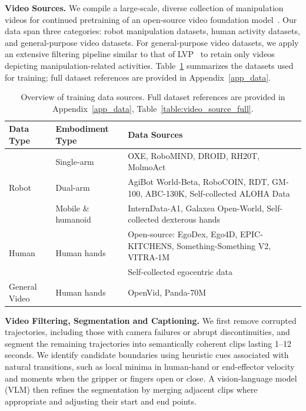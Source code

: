 \textbf{Video Sources.}
We compile a large-scale, diverse collection of manipulation videos for continued pretraining of an open-source video foundation model~\citep{wan2025wan}. Our data span three categories: robot manipulation datasets, human activity datasets, and general-purpose video datasets. For general-purpose video datasets, we apply an extensive filtering pipeline similar to that of LVP~\citep{chen2025large} to retain only videos depicting manipulation-related activities. Table~\ref{table:video_source} summarizes the datasets used for training; full dataset references are provided in Appendix~\ref{app_data}.

\begin{table}[h]
    \centering
    \small
    \setlength{\tabcolsep}{4pt}
    \renewcommand{\arraystretch}{1}
    \begin{tabularx}{\linewidth}{@{}llX@{}}
        \toprule
        Data Type & Embodiment Type & Data Sources \\
        \midrule
        \multirow{3}{*}{Robot}
        & Single-arm
        & OXE, RoboMIND, DROID, RH20T, MolmoAct \\
        & Dual-arm
        & AgiBot World-Beta, RoboCOIN, RDT, GM-100, ABC-130K, Self-collected ALOHA Data\\
        & Mobile \& humanoid
        & InternData-A1, Galaxea Open-World, Self-collected dexterous hands \\
        \midrule
        \multirow{2}{*}{Human}
        & \multirow{2}{*}{Human hands}
        & Open-source: EgoDex, Ego4D, EPIC-KITCHENS, Something-Something V2, VITRA-1M \\
        & & Self-collected egocentric data\\
        \midrule
        General Video
        & Human hands
        & OpenVid, Panda-70M \\
        \bottomrule
    \end{tabularx}
    \caption{Overview of training data sources. Full dataset references are provided in Appendix~\ref{app_data}, Table~\ref{table:video_source_full}.}
    \label{table:video_source}
    \vspace{-3mm}
\end{table}

\textbf{Video Filtering, Segmentation and Captioning.}
We first remove corrupted trajectories, including those with camera failures or abrupt discontinuities, and segment the remaining trajectories into semantically coherent clips lasting 1--12 seconds. We identify candidate boundaries using heuristic cues associated with natural transitions, such as local minima in human-hand or end-effector velocity and moments when the gripper or fingers open or close. A vision-language model (VLM) then refines the segmentation by merging adjacent clips where appropriate and adjusting their start and end points.

